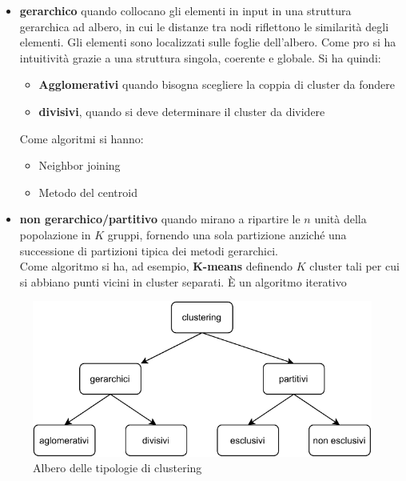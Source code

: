 \begin{itemize}
  \item \textbf{gerarchico} quando collocano gli elementi in input in una
  struttura gerarchica ad albero, in cui le distanze tra nodi riflettono le
  similarità degli elementi. Gli elementi sono localizzati sulle foglie
  dell’albero. Come pro si ha intuitività grazie a una struttura singola,
  coerente e globale. Si ha quindi:
  \begin{itemize}
    \item \textbf{Agglomerativi} quando bisogna scegliere la coppia di cluster da fondere
    \item \textbf{divisivi}, quando si deve determinare il cluster da dividere
  \end{itemize}
  Come algoritmi si hanno:
  \begin{itemize}
    \item Neighbor joining
    \item Metodo del centroid
  \end{itemize}
  \item \textbf{non gerarchico/partitivo} quando mirano a ripartire le $n$ unità
  della popolazione in $K$ gruppi, fornendo una sola partizione anziché una
  successione di partizioni tipica dei metodi gerarchici.\\
  Come algoritmo si ha, ad esempio, \textbf{K-means}
  definendo $K$ cluster tali per cui si abbiano punti vicini in cluster
  separati. È un algoritmo iterativo
\end{itemize}
\begin{figure}
  \centering
  \includegraphics[scale = 1]{img/clu.pdf}
  \caption{Albero delle tipologie di clustering}
  \label{fig:clu}
\end{figure}
